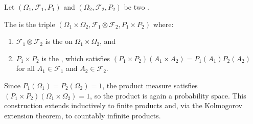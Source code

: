 \begin{definition} \label{definition:product_probability_space}
Let $(\Omega_1, \mathcal{F}_1, P_1)$ and $(\Omega_2, \mathcal{F}_2, P_2)$ be two .

The  is the triple $(\Omega_1 \times \Omega_2, \mathcal{F}_1 \otimes \mathcal{F}_2, P_1 \times P_2)$ where:
\begin{enumerate}
    \item $\mathcal{F}_1 \otimes \mathcal{F}_2$ is the  on $\Omega_1 \times \Omega_2$, and
    \item $P_1 \times P_2$ is the , which satisfies $(P_1 \times P_2)(A_1 \times A_2) = P_1(A_1) P_2(A_2)$ for all $A_1 \in \mathcal{F}_1$ and $A_2 \in \mathcal{F}_2$.
\end{enumerate}

Since $P_1(\Omega_1) = P_2(\Omega_2) = 1$, the product measure satisfies $(P_1 \times P_2)(\Omega_1 \times \Omega_2) = 1$, so the product is again a probability space. This construction extends inductively to finite products and, via the Kolmogorov extension theorem, to countably infinite products.
\end{definition}
